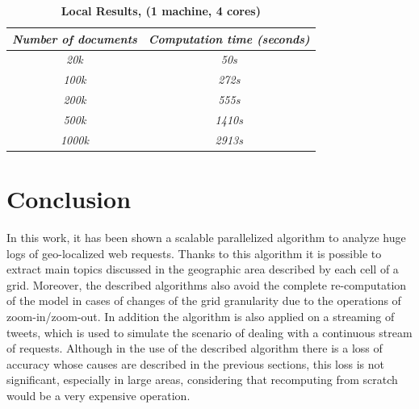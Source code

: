 \begin{table}[h]
\centering
\caption{{\bfseries Local Results, (1 machine, 4 cores)}}
\label{my-label}
\begin{tabular}{@{}cc@{}}
\toprule
\textit{\textbf{Number of documents}} & \textit{\textbf{Computation time (seconds)}} \\ \midrule
\textit{20k}                          & \textit{50s}                                 \\
\textit{100k}                          & \textit{272s}                                \\
\textit{200k}                          & \textit{555s}                                \\
\textit{500k}                          & \textit{1410s}                                \\
\textit{1000k}                          & \textit{2913s}                                \\ \bottomrule
\end{tabular}
\end{table}

\section{Conclusion}

In this work, it has been shown a scalable parallelized algorithm to analyze huge logs of geo-localized web requests. Thanks to this algorithm it is possible to extract main topics discussed in the geographic area described by each cell of a grid. Moreover, the described algorithms also avoid the complete re-computation of the model in cases of changes of the grid granularity due to the operations of zoom-in/zoom-out. In addition the algorithm is also applied on a streaming of tweets, which is used to simulate the scenario of dealing with a continuous stream of requests. Although in the use of the described algorithm there is a loss of accuracy whose causes are described in the previous sections, this loss is not significant, especially in large areas, considering that recomputing from scratch would be a very expensive operation.






